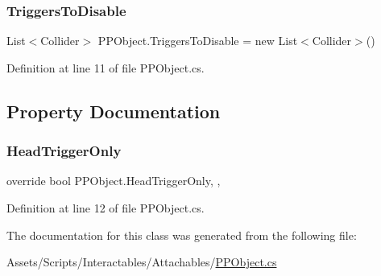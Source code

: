 \subsubsection{\texorpdfstring{Triggers\+To\+Disable}{TriggersToDisable}}
{\footnotesize\ttfamily List$<$Collider$>$ P\+P\+Object.\+Triggers\+To\+Disable = new List$<$Collider$>$()}



Definition at line 11 of file P\+P\+Object.\+cs.



\subsection{Property Documentation}
\mbox{\label{class_p_p_object_a240d0da4ac929975c3091d6a8ecf297e}} 
\subsubsection{\texorpdfstring{Head\+Trigger\+Only}{HeadTriggerOnly}}
{\footnotesize\ttfamily override bool P\+P\+Object.\+Head\+Trigger\+Only\hspace{0.3cm}{\ttfamily [get]}, {\ttfamily [set]}, {\ttfamily [protected]}}



Definition at line 12 of file P\+P\+Object.\+cs.



The documentation for this class was generated from the following file\+:\begin{DoxyCompactItemize}
\item 
Assets/\+Scripts/\+Interactables/\+Attachables/\mbox{\hyperlink{_p_p_object_8cs}{P\+P\+Object.\+cs}}\end{DoxyCompactItemize}
